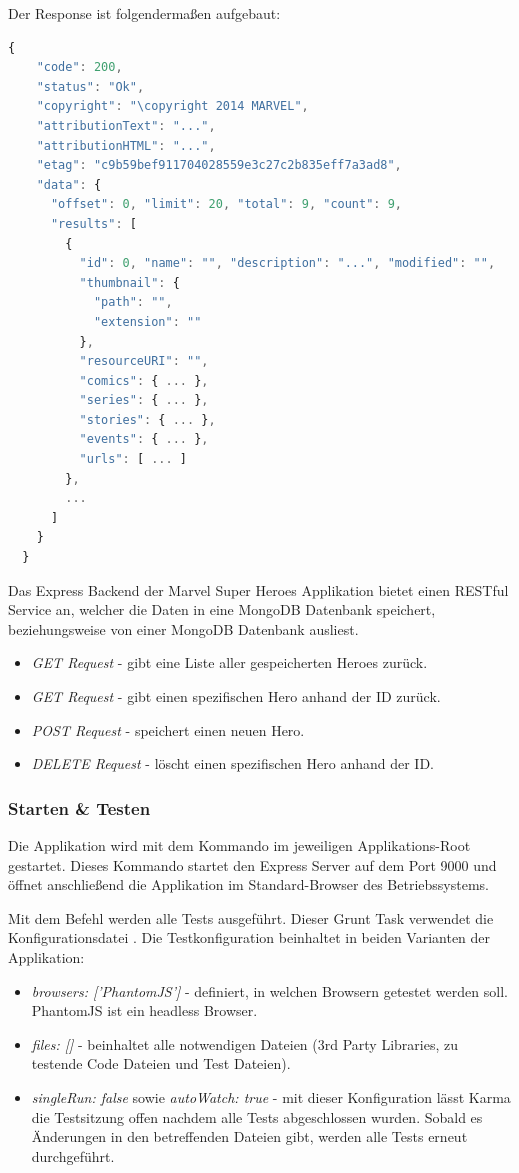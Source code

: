 Der Response ist folgendermaßen aufgebaut:
\begin{lstlisting}[language=JavaScript]
  {
    "code": 200,
    "status": "Ok",
    "copyright": "\copyright 2014 MARVEL",
    "attributionText": "...",
    "attributionHTML": "...",
    "etag": "c9b59bef911704028559e3c27c2b835eff7a3ad8",
    "data": {
      "offset": 0, "limit": 20, "total": 9, "count": 9,
      "results": [
        {
          "id": 0, "name": "", "description": "...", "modified": "",
          "thumbnail": {
            "path": "",
            "extension": ""
          },
          "resourceURI": "",
          "comics": { ... },
          "series": { ... },
          "stories": { ... },
          "events": { ... },
          "urls": [ ... ]
        },
        ...
      ]
    }
  }
\end{lstlisting}

Das Express Backend der Marvel Super Heroes Applikation bietet einen RESTful  Service an, welcher die Daten in eine MongoDB Datenbank speichert, beziehungsweise von einer MongoDB Datenbank ausliest.
\begin{itemize}
  \item \textit{GET Request } - gibt eine Liste aller gespeicherten Heroes zurück.
  \item \textit{GET Request } - gibt einen spezifischen Hero anhand der ID zurück.
  \item \textit{POST Request } - speichert einen neuen Hero.
  \item \textit{DELETE Request } - löscht einen spezifischen Hero anhand der ID.
\end{itemize}

\newpage
\subsubsection{Starten \& Testen}
Die Applikation wird mit dem Kommando  im jeweiligen Applikations-Root gestartet. Dieses Kommando startet den Express Server auf dem Port 9000 und öffnet anschließend die Applikation im Standard-Browser des Betriebssystems.

Mit dem Befehl  werden alle Tests ausgeführt. Dieser Grunt Task verwendet die Konfigurationsdatei .
Die Testkonfiguration beinhaltet in beiden Varianten der Applikation:
\begin{itemize}
  \item \textit{browsers: ['PhantomJS']} - definiert, in welchen Browsern getestet werden soll. PhantomJS ist ein headless Browser.
  \item \textit{files: []} - beinhaltet alle notwendigen Dateien (3rd Party Libraries, zu testende Code Dateien und Test Dateien).
  \item \textit{singleRun: false} sowie \textit{autoWatch: true} - mit dieser Konfiguration lässt Karma die Testsitzung offen nachdem alle Tests abgeschlossen wurden. Sobald es Änderungen in den betreffenden Dateien gibt, werden alle Tests erneut durchgeführt.
\end{itemize}

